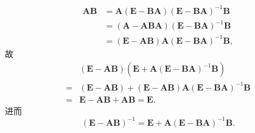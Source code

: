 \documentclass[../../main.tex]{subfiles}
\begin{document}
\begin{solution}
\[\begin{aligned}
\boldsymbol{AB} &= \boldsymbol{A}(\boldsymbol{E} - \boldsymbol{BA})(\boldsymbol{E} - \boldsymbol{BA})^{-1}\boldsymbol{B} \\
&= (\boldsymbol{A} - \boldsymbol{ABA})(\boldsymbol{E} - \boldsymbol{BA})^{-1}\boldsymbol{B} \\
&= (\boldsymbol{E} - \boldsymbol{AB})\boldsymbol{A}(\boldsymbol{E} - \boldsymbol{BA})^{-1}\boldsymbol{B},
\end{aligned}
\]
故
\[
\begin{aligned}
&(\boldsymbol{E} - \boldsymbol{AB})(\boldsymbol{E} + \boldsymbol{A}(\boldsymbol{E} - \boldsymbol{BA})^{-1}\boldsymbol{B}) \\
=& (\boldsymbol{E} - \boldsymbol{AB}) + (\boldsymbol{E} - \boldsymbol{AB})\boldsymbol{A}(\boldsymbol{E} - \boldsymbol{BA})^{-1}\boldsymbol{B} \\
=& \boldsymbol{E} - \boldsymbol{AB} + \boldsymbol{AB} = \boldsymbol{E}.
\end{aligned}
\]
进而
\[
(\boldsymbol{E} - \boldsymbol{AB})^{-1} = \boldsymbol{E} + \boldsymbol{A}(\boldsymbol{E} - \boldsymbol{BA})^{-1}\boldsymbol{B}.
\]


\end{solution}
\end{document}
